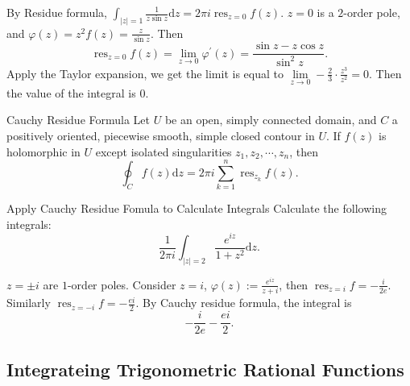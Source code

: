 \begin{solution}
  By Residue formula, $\int_{|z| = 1} \frac{1}{z \sin z}\mathrm{d} z = 2 \pi i \operatorname{res}_{z = 0}f(z)$.
  $z = 0$ is a $2$-order pole, and $\varphi(z) = z^2 f(z) = \frac{z}{\sin z}$.
  Then
  \begin{equation}
    \operatorname{res}_{z = 0} f(z)
    = \lim \limits _{z \rightarrow 0} \varphi^{\prime}(z)
    = \frac{\sin z - z \cos z}{\sin^2 z}.
  \end{equation}
  Apply the Taylor expansion, we get the limit is equal to
  $\lim \limits _{z \rightarrow 0} - \frac{2}{3} \cdot \frac{z^3}{z^2} = 0$.
  Then the value of the integral is $0$.
\end{solution}

\begin{corollary}{Cauchy Residue Formula}{}
  Let $U$ be an open, simply connected domain, and $C$ a positively oriented, piecewise smooth,
  simple closed contour in $U$.
  If $f(z)$ is holomorphic in $U$ except isolated singularities $z_1,z_2,\cdots,z_n$, then
  \begin{equation}
    \oint_C f(z)\mathrm{d} z
    =
    2 \pi i \sum\limits_{k = 1}^n \operatorname{res}_{z_k}f(z).
  \end{equation}
\end{corollary}

\begin{example}{Apply Cauchy Residue Fomula to Calculate Integrals}{}
  Calculate the following integrals:
  \begin{equation}
    \frac{1}{2\pi i} \int_{|z| = 2} \frac{e^{iz}}{1 + z^2}\mathrm{d} z.
  \end{equation}
\end{example}

\begin{solution}
  $z = \pm i$ are $1$-order poles. Consider $z = i$, $\varphi(z) := \frac{e^{iz}}{z + i}$,
  then $\operatorname{res}_{z = i} f = - \frac{i}{2e}$.
  Similarly $\operatorname{res}_{z = -i} f = - \frac{e i}{2}$.
  By Cauchy residue formula, the integral is
  \begin{equation}
    - \frac{i}{2e} - \frac{e i}{2}.
  \end{equation}
\end{solution}

\subsection{Integrateing Trigonometric Rational Functions}

